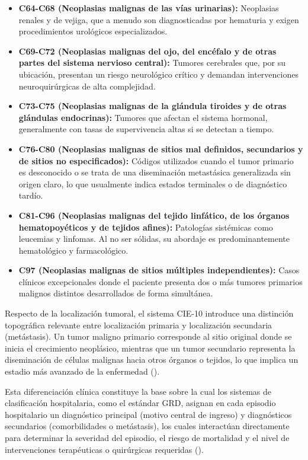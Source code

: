 \begin{itemize}
    \item \textbf{C64-C68 (Neoplasias malignas de las vías urinarias):} Neoplasias renales y de vejiga, que a menudo son diagnosticadas por hematuria y exigen procedimientos urológicos especializados.
    \item \textbf{C69-C72 (Neoplasias malignas del ojo, del encéfalo y de otras partes del sistema nervioso central):} Tumores cerebrales que, por su ubicación, presentan un riesgo neurológico crítico y demandan intervenciones neuroquirúrgicas de alta complejidad.
    \item \textbf{C73-C75 (Neoplasias malignas de la glándula tiroides y de otras glándulas endocrinas):} Tumores que afectan el sistema hormonal, generalmente con tasas de supervivencia altas si se detectan a tiempo.
    \item \textbf{C76-C80 (Neoplasias malignas de sitios mal definidos, secundarios y de sitios no especificados):} Códigos utilizados cuando el tumor primario es desconocido o se trata de una diseminación metastásica generalizada sin origen claro, lo que usualmente indica estados terminales o de diagnóstico tardío.
    \item \textbf{C81-C96 (Neoplasias malignas del tejido linfático, de los órganos hematopoyéticos y de tejidos afines):} Patologías sistémicas como leucemias y linfomas. Al no ser sólidas, su abordaje es predominantemente hematológico y farmacológico.
    \item \textbf{C97 (Neoplasias malignas de sitios múltiples independientes):} Casos clínicos excepcionales donde el paciente presenta dos o más tumores primarios malignos distintos desarrollados de forma simultánea.
\end{itemize}


Respecto de la localización tumoral, el sistema CIE-10 introduce una distinción topográfica relevante entre localización primaria y localización secundaria (metástasis). Un tumor maligno primario corresponde al sitio original donde se inicia el crecimiento neoplásico, mientras que un tumor secundario representa la diseminación de células malignas hacia otros órganos o tejidos, lo que implica un estadio más avanzado de la enfermedad (\cite{paho}).

Esta diferenciación clínica constituye la base sobre la cual los sistemas de clasificación hospitalaria, como el estándar GRD, asignan en cada episodio hospitalario un diagnóstico principal (motivo central de ingreso) y diagnósticos secundarios (comorbilidades o metástasis), los cuales interactúan directamente para determinar la severidad del episodio, el riesgo de mortalidad y el nivel de intervenciones terapéuticas o quirúrgicas requeridas (\cite{ministerio_salud}).

